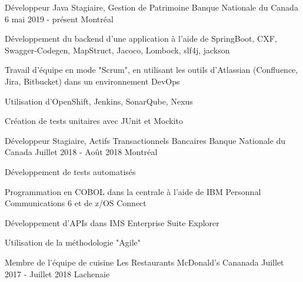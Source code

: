\begin{cventries}
  \cventry
    {Développeur Java Stagiaire, Gestion de Patrimoine}
    {Banque Nationale du Canada}
    {6 mai 2019  - présent}
    {Montréal}
    {
      \begin{cvitems}
      \item{Développement du backend d'une application à l'aide de SpringBoot, CXF, Swagger-Codegen, MapStruct, Jacoco, Lombock, slf4j, jackson}
      \item{Travail d'équipe en mode "Scrum", en utilisant les outils d'Atlassian (Confluence, Jira, Bitbucket) dans un environnement DevOps}
      \item{Utilisation d'OpenShift, Jenkins, SonarQube, Nexus}
      \item{Création de tests unitaires avec JUnit et Mockito}
      \end{cvitems}
    }
  \cventry
    {Développeur Stagiaire, Actifs Transactionnels Bancaires}
    {Banque Nationale du Canada}
    {Juillet 2018 - Août 2018}
    {Montréal}
    {
      \begin{cvitems}
      \item{Développement de tests automatisés}
        \item {Programmation en COBOL dans la centrale à l'aide de IBM Personnal Communications 6 et de z/OS Connect}
        \item {Développement d'APIs dans IMS Enterprise Suite Explorer}
        \item {Utilisation de la méthodologie "Agile"}
      \end{cvitems}
    }
  \cventry
    {Membre de l'équipe de cuisine}
    {Les Restaurants McDonald's Cananada}
    {Juillet 2017 - Juillet 2018}
    {Lachenaie}
    {
    }
\end{cventries}
